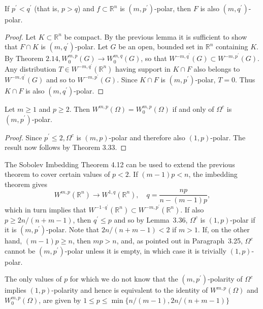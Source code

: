 \begin{lemma}
  If $p^{\prime}<q^{\prime}$ (that is, $p>q$) and $f \subset \mathbb{R}^n$
  is $\left(m, p^{\prime}\right)$-polar, then $F$ is also $\left(m, q^{\prime}\right)$-polar.
\end{lemma}
    
\begin{proof}
  Let $K \subset \mathbb{R}^n$ be compact. By the previous lemma it is sufficient to show that $F \cap K$ is $\left(m, q^{\prime}\right)$-polar. Let $G$ be an open, bounded set in $\mathbb{R}^n$ containing $K$. By Theorem $2.14, W_0^{m, p}(G) \rightarrow W_0^{m, q}(G)$, so that $W^{-m, q^{\prime}}(G) \subset W^{-m, p^{\prime}}(G)$. Any distribution $T \in W^{-m, q^{\prime}}\left(\mathbb{R}^n\right)$ having support in $K \cap F$ also belongs to $W^{-m, q^{\prime}}(G)$ and so to $W^{-m, p^{\prime}}(G)$. Since $K \cap F$ is $\left(m, p^{\prime}\right)$-polar, $T=0$. Thus $K \cap F$ is also $\left(m, q^{\prime}\right)$-polar.
\end{proof}


\begin{theorem}
  Let $m \geq 1$ and $p \geq 2$. Then $W^{m,p}(\Omega)=W_0^{m, p}(\Omega)$ if and only of $\Omega^c$ is $\left(m, p^{\prime}\right)$-polar.
\end{theorem}

\begin{proof}
  Since $p^{\prime} \leq 2, \Omega^c$ is $(m, p)$-polar and therefore also $(1, p)$-polar. The result now follows by Theorem 3.33.
\end{proof}

\begin{para}
  The Sobolev Imbedding Theorem 4.12 can be used to extend the previous theorem to cover certain 
  values of $p<2$. If $(m-1) p<n$, the imbedding theorem gives
  \[
  W^{m,p}\left(\mathbb{R}^n\right) \rightarrow W^{1, q}\left(\mathbb{R}^n\right), \quad q=\frac{n p}{n-(m-1) p},
  \]
  which in turn implies that $W^{-1 \cdot q^{\prime}}\left(\mathbb{R}^n\right) \subset W^{-m, p^{\prime}}\left(\mathbb{R}^n\right)$.
  If also $p \geq 2 n /(n+m-1)$, then $q^{\prime} \leq p$ and so by Lemma~3.36, $\Omega^c$
  is $(1, p)$-polar if it is $\left(m, p^{\prime}\right)$-polar. Note that $2 n /(n+m-1)<2$
  if $m>1$. If, on the other hand, $(m-1) p \geq n$, then $m p>n$, and, as pointed out in 
  Paragraph~3.25, $\Omega^c$ cannot be $\left(m, p^{\prime}\right)$-polar unless it is empty,
  in which case it is trivially $(1, p)$-polar.
  
  The only values of $p$ for which we do not know that the $\left(m, p^{\prime}\right)$-polarity 
  of $\Omega^c$ implies $(1, p)$-polarity and hence is equivalent to the identity of $W^{m,p}(\Omega)$ and $W_0^{m, p}(\Omega)$, are given by $1 \leq p \leq \min \{n /(m-1), 2 n /(n+m-1)\}$
\end{para}

